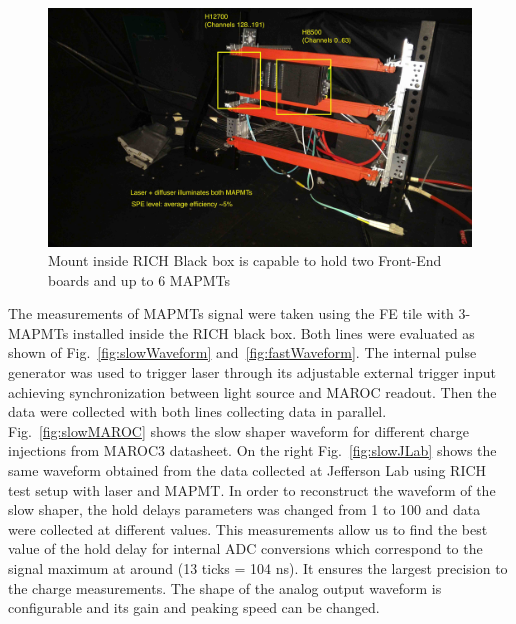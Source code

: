 \begin{figure}[hbt]
  \centering
  \includegraphics[width=0.9\linewidth]{figures/LaserSetup.jpg}
  \caption{Mount inside RICH Black box is capable to hold two Front-End boards and up to 6 MAPMTs}
  \label{fig:FEmount}
\end{figure}


The measurements of MAPMTs signal were taken using the FE tile with 3-MAPMTs installed inside the RICH black box.
Both lines were evaluated as shown of Fig.~\ref{fig:slowWaveform} and~\ref{fig:fastWaveform}.
The internal pulse generator was used to trigger laser through its adjustable external trigger input achieving synchronization between light source and MAROC readout.
Then the data were collected with both lines collecting data in parallel.
Fig.~\ref{fig:slowMAROC} shows the slow shaper waveform for different charge injections from MAROC3 datasheet.
On the right Fig.~\ref{fig:slowJLab} shows the same waveform obtained from the data collected at Jefferson Lab using RICH test setup with laser and MAPMT.
In order to reconstruct the waveform of the slow shaper, the hold delays parameters was changed from 1 to 100 and data were collected at different values.
This measurements allow us to find the best value of the hold delay for internal ADC conversions which correspond to the signal maximum at around (13 ticks = 104 ns).
It ensures the largest precision to the charge measurements.
The shape of the analog output waveform is configurable and its gain and peaking speed can be changed.


